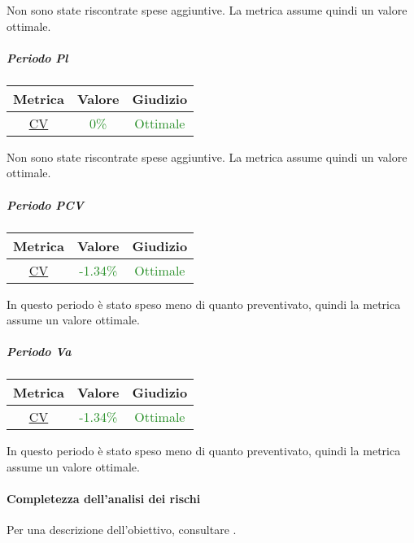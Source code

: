 					Non sono state riscontrate spese aggiuntive. La metrica assume quindi un valore ottimale.
					
				\subparagraph{Periodo Pl}
					\begin{table}[H]
						\centering
						\begin{tabular}{  c | c | c}
							\hline
							\textbf{Metrica} & \textbf{Valore} & \textbf{Giudizio} \\
							\hline
							\hyperref[MRDB]{CV}    & \textcolor{ForestGreen}{0\%}      & \textcolor{ForestGreen}{Ottimale}  \\\hline
						\end{tabular}
					\end{table}
%				
					Non sono state riscontrate spese aggiuntive. La metrica assume quindi un valore ottimale.
					
					\subparagraph{Periodo PCV}
					\begin{table}[H]
						\centering
						\begin{tabular}{  c | c | c}
							\hline
							\textbf{Metrica} & \textbf{Valore} & \textbf{Giudizio} \\
							\hline
							\hyperref[MRDB]{CV}    & \textcolor{ForestGreen}{-1.34\%}      & \textcolor{ForestGreen}{Ottimale}  \\\hline
						\end{tabular}
					\end{table}
					In questo periodo è stato speso meno di quanto preventivato, quindi la metrica assume un valore ottimale.
					
					\subparagraph{Periodo Va} %
					\begin{table}[H]
						\centering
						\begin{tabular}{  c | c | c}
							\hline
							\textbf{Metrica} & \textbf{Valore} & \textbf{Giudizio} \\
							\hline
							\hyperref[MRDB]{CV}    & \textcolor{ForestGreen}{-1.34\%}      & \textcolor{ForestGreen}{Ottimale}  \\\hline
						\end{tabular}
					\end{table}
					In questo periodo è stato speso meno di quanto preventivato, quindi la metrica assume un valore ottimale.
					\newpage
					
			\paragraph{Completezza dell'analisi dei rischi}
			\label{RCDADR}
				Per una descrizione dell'obiettivo, consultare .
			
